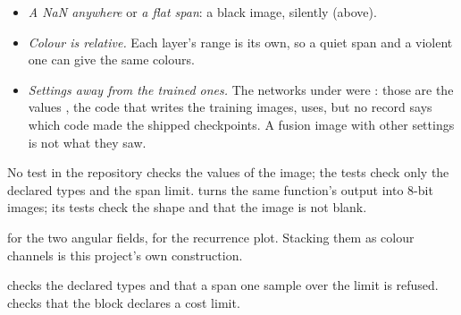 \begin{itemize}
\item \emph{A NaN anywhere} or \emph{a flat span}: a black image, silently (above).
\item \emph{Colour is relative.} Each layer's range is its own, so a quiet span and a
  violent one can give the same colours.
\item \emph{Settings away from the trained ones.} The networks under
   were : those are the values , the code that writes the
  training images, uses, but no record says which code made the shipped checkpoints. A
  fusion image with other settings is not what
  they saw.
\end{itemize}

No test in the repository checks the values of the image; the tests check only the declared
types and the span limit.  turns the same function's output
into 8-bit images; its tests check the shape and that the image is not blank.

\citet{wang2015imaging} for the two angular fields, \citet{eckmann1987recurrence} for the
recurrence plot. Stacking them as colour channels is this project's own construction.

 checks the declared types and that a span one sample
over the limit is refused.  checks that the block declares
a cost limit.

